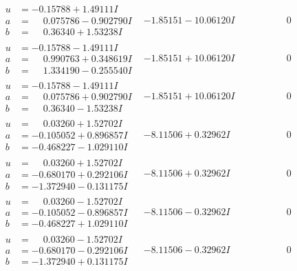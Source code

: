 \documentclass[1p]{elsarticle_modified}
\theoremstyle{definition}
\begin{document}
$$\begin{array}{c|c|c}
\begin{aligned}
u &= -0.15788 + 1.49111 I \\
a &= \phantom{-}0.075786 - 0.902790 I \\
b &= \phantom{-}0.36340 + 1.53238 I\end{aligned}
 & -1.85151 - 10.06120 I & \phantom{-0.000000 } 0 \\ \hline\begin{aligned}
u &= -0.15788 - 1.49111 I \\
a &= \phantom{-}0.990763 + 0.348619 I \\
b &= \phantom{-}1.334190 - 0.255540 I\end{aligned}
 & -1.85151 + 10.06120 I & \phantom{-0.000000 } 0 \\ \hline\begin{aligned}
u &= -0.15788 - 1.49111 I \\
a &= \phantom{-}0.075786 + 0.902790 I \\
b &= \phantom{-}0.36340 - 1.53238 I\end{aligned}
 & -1.85151 + 10.06120 I & \phantom{-0.000000 } 0 \\ \hline\begin{aligned}
u &= \phantom{-}0.03260 + 1.52702 I \\
a &= -0.105052 + 0.896857 I \\
b &= -0.468227 - 1.029110 I\end{aligned}
 & -8.11506 + 0.32962 I & \phantom{-0.000000 } 0 \\ \hline\begin{aligned}
u &= \phantom{-}0.03260 + 1.52702 I \\
a &= -0.680170 + 0.292106 I \\
b &= -1.372940 - 0.131175 I\end{aligned}
 & -8.11506 + 0.32962 I & \phantom{-0.000000 } 0 \\ \hline\begin{aligned}
u &= \phantom{-}0.03260 - 1.52702 I \\
a &= -0.105052 - 0.896857 I \\
b &= -0.468227 + 1.029110 I\end{aligned}
 & -8.11506 - 0.32962 I & \phantom{-0.000000 } 0 \\ \hline\begin{aligned}
u &= \phantom{-}0.03260 - 1.52702 I \\
a &= -0.680170 - 0.292106 I \\
b &= -1.372940 + 0.131175 I\end{aligned}
 & -8.11506 - 0.32962 I & \phantom{-0.000000 } 0\\

\end{array}$$
\end{document}
